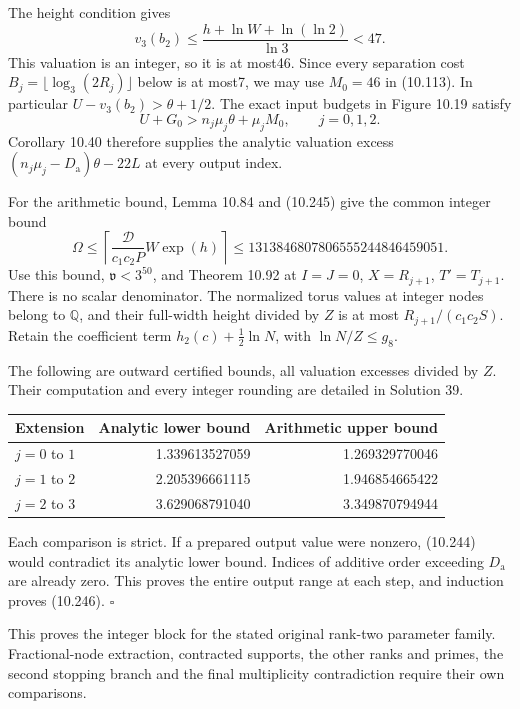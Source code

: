 \documentclass[
  11pt,
  a4paper,
]{article}
\newcounter{none} %
\begin{document}
The height condition gives \[
v_3(b_2)\le\frac{h+\ln W+\ln(\ln2)}{\ln3}<47 .
\] This valuation is an integer, so it is at most46. Since every
separation cost \(B_j=\lfloor\log_3(2R_j)\rfloor\) below is at most7, we
may use \(M_0=46\) in (10.113). In particular \(U-v_3(b_2)>\theta+1/2\).
The exact input budgets in Figure 10.19 satisfy \[
U+G_0>n_j\mu_j\theta+\mu_jM_0,\qquad j=0,1,2.
\] Corollary 10.40 therefore supplies the analytic valuation excess
\((n_j\mu_j-D_{\mathrm a})\theta-22L\) at every output index.

For the arithmetic bound, Lemma 10.84 and (10.245) give the common
integer bound \[
\Omega\le
\left\lceil\frac{\mathcal D}{c_1c_2P}W\exp(h)\right\rceil
\le1313846807806555244846459051 .
\] Use this bound, \(\mathfrak v<3^{50}\), and Theorem 10.92 at
\(I=J=0\), \(X=R_{j+1}\), \(T'=T_{j+1}\). There is no scalar
denominator. The normalized torus values at integer nodes belong to
\(\mathbb Q\), and their full-width height divided by \(Z\) is at most
\(R_{j+1}/(c_1c_2S)\). Retain the coefficient term
\(h_2(c)+\frac12\ln N\), with \(\ln N/Z\le g_8\).

The following are outward certified bounds, all valuation excesses
divided by \(Z\). Their computation and every integer rounding are
detailed in Solution 39.

{\def\LTcaptype{none} %
\begin{longtable}[]{@{}lrr@{}}
\toprule\noalign{}
Extension & Analytic lower bound & Arithmetic upper bound \\
\midrule\noalign{}
\endhead
\bottomrule\noalign{}
\endlastfoot
\(j=0\) to \(1\) & 1.339613527059 & 1.269329770046 \\
\(j=1\) to \(2\) & 2.205396661115 & 1.946854665422 \\
\(j=2\) to \(3\) & 3.629068791040 & 3.349870794944 \\
\end{longtable}
}

Each comparison is strict. If a prepared output value were nonzero,
(10.244) would contradict its analytic lower bound. Indices of additive
order exceeding \(D_{\mathrm a}\) are already zero. This proves the
entire output range at each step, and induction proves (10.246).
\(\square\)

This proves the integer block for the stated original rank-two parameter
family. Fractional-node extraction, contracted supports, the other ranks
and primes, the second stopping branch and the final multiplicity
contradiction require their own comparisons.
\end{document}
